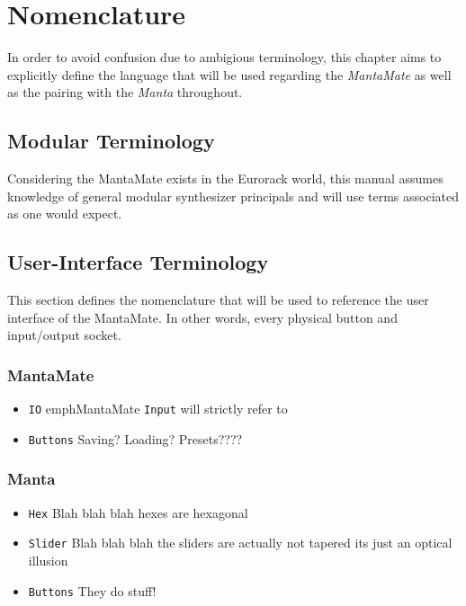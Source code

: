 \renewcommand{\chaptername}{Section}
\chapter{Nomenclature}
\begin{intro}
In order to avoid confusion due to ambigious terminology, this chapter
aims to explicitly define the language that will be used regarding
the \emph{MantaMate} as well as the pairing with the \emph{Manta} throughout.
\end{intro}

\section{Modular Terminology}

Considering the MantaMate exists in the Eurorack world, this manual assumes
knowledge of general modular synthesizer principals and will use terms associated
as one would expect.


\section{User-Interface Terminology}

This section defines the nomenclature that will be used to reference the
user interface of the MantaMate. In other words, every physical button
and input/output socket.

\subsection{MantaMate}
\begin{itemize}

  \item \texttt{IO} emph{MantaMate} \texttt{Input} will strictly refer to
  \item \texttt{Buttons} Saving? Loading? Presets????

\end{itemize}

\subsection{Manta}
\begin{itemize}

  \item \texttt{Hex} Blah blah blah hexes are hexagonal
  \item \texttt{Slider} Blah blah blah the sliders are actually
                  not tapered its just an optical illusion
  \item \texttt{Buttons} They do stuff!

\end{itemize}

